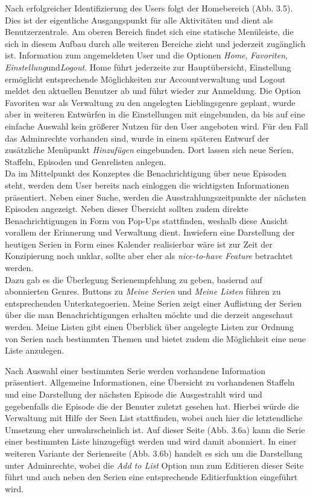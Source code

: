 Nach erfolgreicher Identifizierung des Users folgt der Homebereich (Abb. 3.5). Dies ist der eigentliche Ausgangspunkt für alle Aktivitäten und dient als Benutzerzentrale. Am oberen Bereich findet sich eine statische Menüleiste, die sich in diesem Aufbau durch alle weiteren Bereiche zieht und jederzeit zugänglich ist. Information zum angemeldeten User und die Optionen \textit{Home}, \textit{Favoriten}, \textit{Einstellung}und\textit {Logout}. Home führt jederzeite zur Hauptübersicht, Einstellung ermöglicht entsprechende Möglichkeiten zur Accountverwaltung und Logout meldet den aktuellen Benutzer ab und führt wieder zur Anmeldung. Die Option Favoriten war als Verwaltung zu den angelegten Lieblingsgenre geplant, wurde aber in weiteren Entwürfen in die Einstellungen mit eingebunden, da bis auf eine einfache Auswahl kein größerer Nutzen für den User angeboten wird. Für den Fall das Adminrechte vorhanden sind, wurde in einem späteren Entwurf der zusätzliche Menüpunkt \textit{Hinzufügen} eingebunden. Dort lassen sich neue Serien, Staffeln, Episoden und Genrelisten anlegen. \\


Da im Mittelpunkt des Konzeptes die Benachrichtigung über neue Episoden steht, werden dem User bereits nach einloggen die wichtigsten Informationen präsentiert. Neben einer Suche, werden die Ausstrahlungszeitpunkte der nächsten Episoden angezeigt. Neben dieser Übersicht sollten zudem direkte Benachrichtigungen in Form von Pop-Ups stattfinden, weshalb diese Ansicht vorallem der Erinnerung und Verwaltung dient. Inwiefern eine Darstellung der heutigen Serien in Form eines Kalender realisierbar wäre ist zur Zeit der Konzipierung noch unklar, sollte aber eher als \textit{nice-to-have Feature} betrachtet werden.\\
Dazu gab es die Überlegung Serienempfehlung zu geben, basiernd auf abonnierten Genres. Buttons zu \textit{Meine Serien} und \textit{Meine Listen} führen zu entsprechenden Unterkategoerien.
Meine Serien zeigt einer Auflistung der Serien über die man Benachrichtigungen erhalten möchte und die derzeit angeschaut werden. Meine Listen gibt einen Überblick über angelegte Listen zur Ordnung von Serien nach bestimmten Themen und bietet zudem die Möglichkeit eine neue Liste anzulegen. \\

\parskip 12pt
\parindent 0pt

Nach Auswahl einer bestimmten Serie werden vorhandene Information präsentiert. Allgemeine Informationen, eine Übersicht zu vorhandenen Staffeln und eine Darstellung der nächsten Episode die Ausgestrahlt wird und gegebenfalls die Episode die der Benuter zuletzt gesehen hat. Hierbei würde die Verwaltung mit Hilfe der Seen List stattfinden, wobei auch hier die letztendliche Umsetzung eher unwahrscheinlich ist.
Auf dieser Seite (Abb. 3.6a) kann die Serie einer bestimmten Liste hinzugefügt werden und wird damit abonniert. In einer weiteren Variante der Serienseite (Abb. 3.6b) handelt es sich um die Darstellung unter Adminrechte, wobei die \textit{Add to List} Option nun zum Editieren dieser Seite führt und auch neben den Serien eine entsprechende Editierfunktion eingeführt wird.

